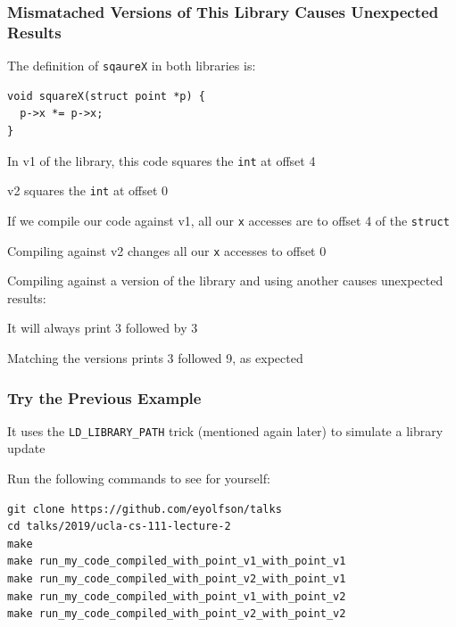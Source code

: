 \documentclass[aspectratio=169]{beamer}
\begin{document}
  \begin{frame}[fragile]
    \frametitle{Mismatached Versions of This Library Causes Unexpected Results}

    The definition of \texttt{sqaureX} in both libraries is:
    \begin{lstlisting}[basicstyle=\small\ttfamily]
void squareX(struct point *p) {
  p->x *= p->x;
}
    \end{lstlisting}

    \vspace{1em}

    In v1 of the library, this code squares the \texttt{int} at offset 4

    \hspace{1em} v2 squares the \texttt{int} at offset 0

    \vspace{1em}

    If we compile our code against v1, all our \texttt{x}
    accesses are to offset 4 of the \texttt{struct}

    \hspace{1em} Compiling against v2 changes all our \texttt{x} accesses to
    offset 0

    \vspace{2em}
    Compiling against a version of the library and using another
    causes unexpected results:

    \hspace{1em} It will always print 3 followed by 3

    \hspace{2em} Matching the versions prints 3 followed 9, as expected
  \end{frame}

  \begin{frame}[fragile]
    \frametitle{Try the Previous Example}

    It uses the \texttt{LD\_LIBRARY\_PATH} trick (mentioned again later) to
    simulate a library update

    \vspace{2em}

    Run the following commands to see for yourself:
    \begin{lstlisting}[commentstyle={}]
git clone https://github.com/eyolfson/talks
cd talks/2019/ucla-cs-111-lecture-2
make
make run_my_code_compiled_with_point_v1_with_point_v1
make run_my_code_compiled_with_point_v2_with_point_v1
make run_my_code_compiled_with_point_v1_with_point_v2
make run_my_code_compiled_with_point_v2_with_point_v2
    \end{lstlisting}
  \end{frame}
\end{document}
